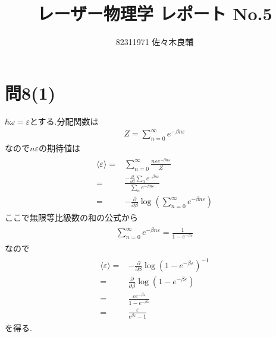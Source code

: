 \documentclass[uplatex,a4j,11pt,dvipdfmx]{jsarticle}
\begin{document}
\title{レーザー物理学 レポート No.5}
\author{82311971 佐々木良輔}
\date{}
\maketitle
\section*{問8(1)}
$\hbar\omega=\varepsilon$とする.分配関数は
\begin{align}
  Z=\sum_{n=0}^\infty e^{-\beta n\varepsilon}
\end{align}
なので$n\varepsilon$の期待値は
\begin{align}
  \begin{split}
    \langle\varepsilon\rangle=&\sum_{n=0}^\infty\frac{n\varepsilon e^{-\beta n\varepsilon}}{Z}\\
    =&\frac{-\frac{\partial}{\partial\beta}\sum_n e^{-\beta n\varepsilon}}{\sum_ne^{-\beta n\varepsilon}}\\
    =&-\frac{\partial}{\partial\beta}\log\left(\sum_{n=0}^\infty e^{-\beta n\varepsilon}\right)
  \end{split}
\end{align}
ここで無限等比級数の和の公式から
\begin{align}
  \begin{split}
    \sum_{n=0}^\infty e^{-\beta n\varepsilon}=\frac{1}{1-e^{-\beta\varepsilon}}
  \end{split}
\end{align}
なので
\begin{align}
  \begin{split}
    \langle\varepsilon\rangle=&-\frac{\partial}{\partial\beta}\log\left(1-e^{-\beta\varepsilon}\right)^{-1}\\
    =&\frac{\partial}{\partial\beta}\log\left(1-e^{-\beta\varepsilon}\right)\\
    =&\frac{\varepsilon e^{-\beta\varepsilon}}{1-e^{-\beta\varepsilon}}\\
    =&\frac{\varepsilon}{e^{\beta\varepsilon}-1}
  \end{split}
\end{align}
を得る.
\end{document}
